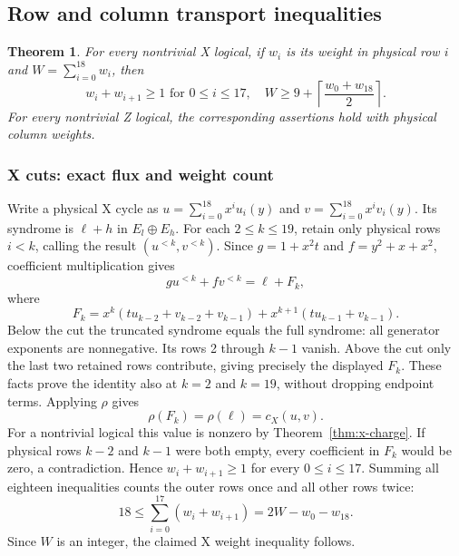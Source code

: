 \documentclass{article}
\newtheorem{theorem}{Theorem}
\begin{document}
\subsection{Row and column transport inequalities}\label{app:cuts}

\begin{theorem}\label{thm:cuts}
  For every nontrivial X logical, if \(w_i\) is its weight in physical row
  \(i\) and \(W = \sum_{i=0}^{18} w_i\), then
  \begin{equation}
    w_i + w_{i+1} \ge 1 \text{ for } 0 \le i \le 17,
    \quad W \ge 9 + \left\lceil \frac{w_0 + w_{18}}{2} \right\rceil.
  \end{equation}
  For every nontrivial Z logical, the corresponding assertions hold with
  physical column weights.
\end{theorem}

\subsubsection{X cuts: exact flux and weight count}\label{app:x-cuts}

Write a physical X cycle as
\(u = \sum_{i=0}^{18} x^i u_i(y)\) and
\(v = \sum_{i=0}^{18} x^i v_i(y)\).
Its syndrome is \(\ell + h\) in \(E_l \oplus E_h\).
For each \(2 \le k \le 19\), retain only physical rows \(i < k\), calling the
result \((u^{<k}, v^{<k})\). Since \(g = 1 + x^2 t\) and \(f = y^2 + x + x^2\),
coefficient multiplication gives
\begin{equation}
  g u^{<k} + f v^{<k} = \ell + F_k,
\end{equation}
where
\begin{equation}
  F_k = x^k (t u_{k-2} + v_{k-2} + v_{k-1})
      + x^{k+1} (t u_{k-1} + v_{k-1}).
\end{equation}
Below the cut the truncated syndrome equals the full syndrome: all
generator exponents are nonnegative. Its rows 2 through \(k - 1\) vanish.
Above the cut only the last two retained rows contribute, giving precisely
the displayed \(F_k\). These facts prove the identity also at \(k = 2\) and
\(k = 19\), without dropping endpoint terms.
Applying \(\rho\) gives
\begin{equation}
  \rho(F_k) = \rho(\ell) = c_X(u,v).
\end{equation}
For a nontrivial logical this value is nonzero by Theorem~\ref{thm:x-charge}.
If physical rows \(k - 2\) and \(k - 1\) were both empty, every coefficient in
\(F_k\) would be zero, a contradiction. Hence
\(w_i + w_{i+1} \ge 1\) for every \(0 \le i \le 17\).
Summing all eighteen inequalities counts the outer rows once and all
other rows twice:
\begin{equation}
  18 \le \sum_{i=0}^{17} (w_i + w_{i+1}) = 2W - w_0 - w_{18}.
\end{equation}
Since \(W\) is an integer, the claimed X weight inequality follows.
\end{document}
